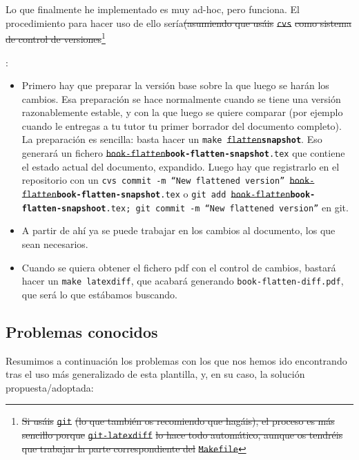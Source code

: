 \documentclass[spanish,openright]{book}
\providecommand{\DIFadd}[1]{{\protect\color{blue}\textbf{#1}}}
\providecommand{\DIFdel}[1]{{\protect\color{red}\sout{#1}}}
\providecommand{\DIFaddtex}[1]{{\protect\color{blue}\uwave{#1}}} %
\providecommand{\DIFdeltex}[1]{{\protect\color{red}\sout{#1}}}                      %
\providecommand{\DIFaddbegin}{} %
\providecommand{\DIFaddend}{} %
\providecommand{\DIFdelbegin}{} %
\providecommand{\DIFdelend}{} %
\providecommand{\DIFadd}[1]{\texorpdfstring{\DIFaddtex{#1}}{#1}} %
\providecommand{\DIFdel}[1]{\texorpdfstring{\DIFdeltex{#1}}{}} %
\newcommand{\DIFscaledelfig}{0.5}
\newlength{\DIFdelgraphicswidth} %
\newlength{\DIFdelgraphicsheight} %
\newcommand{\DIFaddincludegraphics}[2][]{{\color{blue}\fbox{\DIFOincludegraphics[#1]{#2}}}} %
\newcommand{\DIFdelincludegraphics}[2][]{%
\sbox{\DIFdelgraphicsbox}{\DIFOincludegraphics[#1]{#2}}%
\settoboxwidth{\DIFdelgraphicswidth}{\DIFdelgraphicsbox} %
\settoboxtotalheight{\DIFdelgraphicsheight}{\DIFdelgraphicsbox} %
\scalebox{\DIFscaledelfig}{%
\parbox[b]{\DIFdelgraphicswidth}{\usebox{\DIFdelgraphicsbox}\\[-\baselineskip] \rule{\DIFdelgraphicswidth}{0em}}\llap{\resizebox{\DIFdelgraphicswidth}{\DIFdelgraphicsheight}{%
\setlength{\unitlength}{\DIFdelgraphicswidth}%
\begin{picture}(1,1)%
\thicklines\linethickness{2pt} %
{\color[rgb]{1,0,0}\put(0,0){\framebox(1,1){}}}%
{\color[rgb]{1,0,0}\put(0,0){\line( 1,1){1}}}%
{\color[rgb]{1,0,0}\put(0,1){\line(1,-1){1}}}%
\end{picture}%
}\hspace*{3pt}}} %
} %
\DeclareRobustCommand{\DIFaddbegin}{\DIFOaddbegin \let\includegraphics\DIFaddincludegraphics} %
\DeclareRobustCommand{\DIFaddend}{\DIFOaddend \let\includegraphics\DIFOincludegraphics} %
\DeclareRobustCommand{\DIFdelbegin}{\DIFOdelbegin \let\includegraphics\DIFdelincludegraphics} %
\DeclareRobustCommand{\DIFdelend}{\DIFOaddend \let\includegraphics\DIFOincludegraphics} %
\begin{document}
Lo que finalmente he implementado es muy ad-hoc, pero funciona. El
procedimiento para hacer uso de ello sería\DIFdelbegin \DIFdel{(asumiendo que usáis
}\texttt{\DIFdel{cvs}} %
\DIFdel{como sistema de control de versiones}\footnote{\DIFdel{Si usáis
}\texttt{\DIFdel{git}} %
\DIFdel{(lo que también os recomiendo que hagáis), el proceso es
más sencillo porque }\texttt{\DIFdel{git-latexdiff}} %
\DIFdel{lo hace todo automático,
aunque os tendréis que trabajar la parte correspondiente del
}\texttt{\DIFdel{Makefile}}%
}%
\addtocounter{footnote}{-1}%
\DIFdelend :

\begin{itemize}
\item Primero hay que preparar la versión base sobre la que luego se
harán los cambios. Esa preparación se hace normalmente cuando se
tiene una versión razonablemente estable, y con la que luego se
quiere comparar (por ejemplo cuando le entregas a tu tutor tu primer
borrador del documento completo). La preparación es sencilla: basta
hacer un \texttt{make \DIFdelbegin \DIFdel{flatten}\DIFdelend \DIFaddbegin \DIFadd{snapshot}\DIFaddend }. Eso generará un fichero
\texttt{\DIFdelbegin \DIFdel{book-flatten}\DIFdelend \DIFaddbegin \DIFadd{book-flatten-snapshot}\DIFaddend .tex} que contiene el estado actual del
documento, expandido. Luego hay que registrarlo en el repositorio
con un \texttt{cvs commit -m ``New flattened version''
\DIFdelbegin \DIFdel{book-flatten}\DIFdelend \DIFaddbegin \DIFadd{book-flatten-snapshot}\DIFaddend .tex} o \texttt{git add \DIFdelbegin \DIFdel{book-flatten}\DIFdelend \DIFaddbegin \DIFadd{book-flatten-snapshoot}\DIFaddend .tex; git commit
-m ``New flattened version''} en git.
\item A partir de ahí ya se puede trabajar en los cambios al documento,
los que sean necesarios.
\item Cuando se quiera obtener el fichero pdf con el control de cambios,
bastará hacer un \texttt{make latexdiff}, que acabará generando
\texttt{book-flatten-diff.pdf}, que será lo que estábamos buscando.
\end{itemize}



\subsection{Problemas conocidos}
\label{sec:problemas-conocidos}

Resumimos a continuación los problemas con los que nos hemos ido
encontrando tras el uso más generalizado de esta plantilla, y, en su
caso, la solución propuesta/adoptada:
\end{document}

